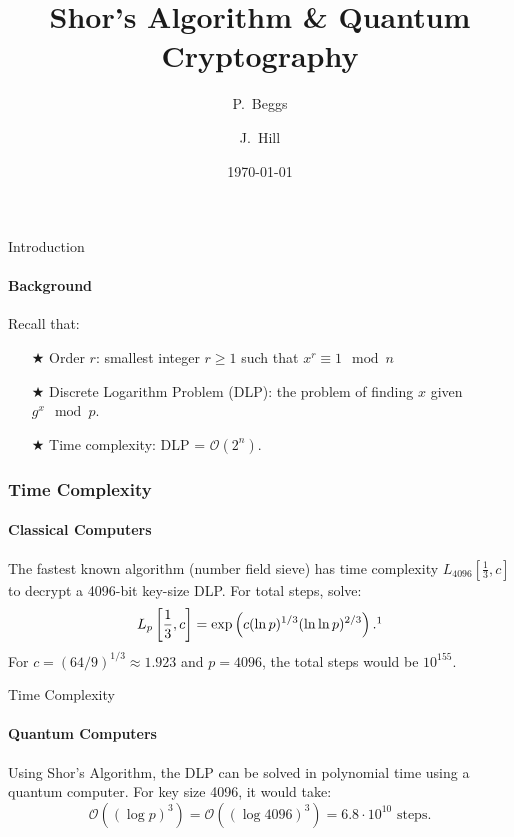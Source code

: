\documentclass{beamer}
\title{Shor's Algorithm \& Quantum Cryptography}
\author[Beggs, Hill] %
{P.~Beggs \and J.~Hill}
\institute%
{
  Department of Mathematics and Computer Science\\
  Hendrix College}
\date{\today}
\begin{document}
\begin{frame}
    \titlepage
\end{frame}



\begin{frame}{Introduction}
	\framesubtitle{Background}
		Recall that: 
		\begin{itemize}
		\item[$\bigstar$] Order \(r\): smallest integer \(r \geq 1\) such that \(x^r \equiv 1 \mod n\)
		\pause
        \item[$\bigstar$] Discrete Logarithm Problem (DLP): the problem of finding \(x\) given \(g^x\mod p\).
		\pause
		\item[$\bigstar$] Time complexity: DLP = \(\mathcal{O}(2^{n})\).
	\end{itemize}
\end{frame}




\begin{frame}
	\frametitle{Time Complexity}
	\framesubtitle{Classical Computers}
	The fastest known algorithm (number field sieve) has time complexity \(L_{4096}[\frac{1}{3},c]\) to decrypt a 4096-bit key-size DLP.
	For total steps, solve:
	\[
		L_{p}\left[\frac{1}{3},c\right] = \exp\left(c(\ln p)^{1/3}(\ln\ln p)^{2/3}\right).\footnote{Menezes, A. J., Van Oorschot, P. C., \& Vanstone, S. A. (2018). \textit{Handbook of applied cryptography.} CRC press.
		}
	\]
	\pause
	For \(c = (64/9)^{1/3} \approx 1.923\) and \(p = 4096\), the total steps would be \(10^{155}\). 
\end{frame}




\begin{frame}{Time Complexity}
	\framesubtitle{Quantum Computers}
	Using Shor's Algorithm, the DLP can be solved in polynomial time using a quantum computer. For key size 4096, it would take:
	\pause
	\[
		\mathcal{O}\left((\log p)^{3}\right) = \mathcal{O}\left((\log 4096)^{3}\right) = 6.8 \cdot 10^{10} \text{ steps.}
	\]
\end{frame}
\end{document}
